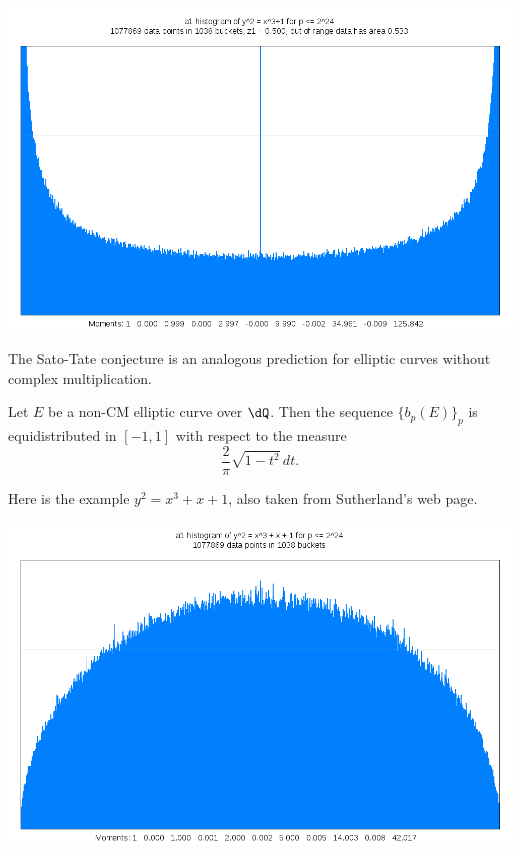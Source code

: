 \begin{center}
  \includegraphics[scale=.3]{plots/Sato-Tate_CM.png}
\end{center}

The Sato-Tate conjecture is an analogous prediction for elliptic curves 
without complex multiplication. 

\begin{conjecture}
Let $E$ be a non-CM elliptic curve over $\dQ$. Then the sequence 
$\{b_p(E)\}_p$ is equidistributed in $[-1,1]$ with respect to the 
measure 
\[
  \frac{2}{\pi} \sqrt{1-t^2}\, dt \text{.}
\]
\end{conjecture}

Here is the example $y^2=x^3+x+1$, also taken from Sutherland's web page. 

\begin{center}
  \includegraphics[scale=.3]{plots/Sato-Tate_nonCM.png}
\end{center}


